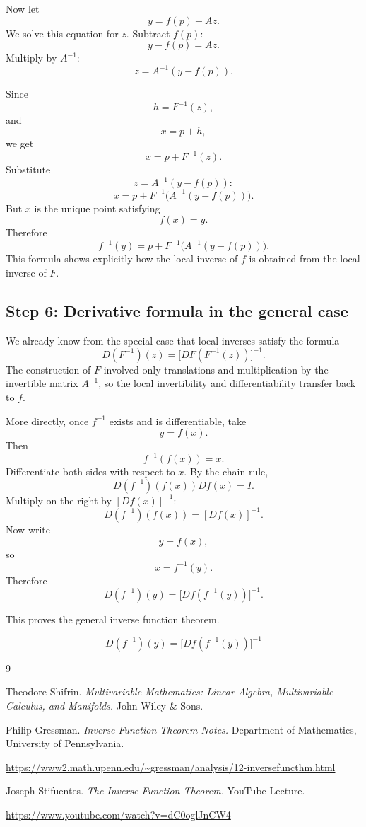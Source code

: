 \documentclass[11pt]{article}
\begin{document}
Now let
\[
y=f(p)+Az.
\]
We solve this equation for $z$. Subtract $f(p)$:
\[
y-f(p)=Az.
\]
Multiply by $A^{-1}$:
\[
z=A^{-1}(y-f(p)).
\]

Since
\[
h=F^{-1}(z),
\]
and
\[
x=p+h,
\]
we get
\[
x=p+F^{-1}(z).
\]
Substitute
\[
z=A^{-1}(y-f(p)):
\]
\[
x=p+F^{-1}\bigl(A^{-1}(y-f(p))\bigr).
\]
But $x$ is the unique point satisfying
\[
f(x)=y.
\]
Therefore
\[
f^{-1}(y)=p+F^{-1}\bigl(A^{-1}(y-f(p))\bigr).
\]
This formula shows explicitly how the local inverse of $f$ is obtained from the local inverse of $F$.

\subsection*{Step 6: Derivative formula in the general case}

We already know from the special case that local inverses satisfy the formula
\[
D(F^{-1})(z)=\bigl[DF(F^{-1}(z))\bigr]^{-1}.
\]
The construction of $F$ involved only translations and multiplication by the invertible matrix $A^{-1}$, so the local invertibility and differentiability transfer back to $f$.

More directly, once $f^{-1}$ exists and is differentiable, take
\[
y=f(x).
\]
Then
\[
f^{-1}(f(x))=x.
\]
Differentiate both sides with respect to $x$. By the chain rule,
\[
D(f^{-1})(f(x))Df(x)=I.
\]
Multiply on the right by $[Df(x)]^{-1}$:
\[
D(f^{-1})(f(x))= [Df(x)]^{-1}.
\]
Now write
\[
y=f(x),
\]
so
\[
x=f^{-1}(y).
\]
Therefore
\[
D(f^{-1})(y)=\bigl[Df(f^{-1}(y))\bigr]^{-1}.
\]

This proves the general inverse function theorem.

\[
\boxed{D(f^{-1})(y)=\bigl[Df(f^{-1}(y))\bigr]^{-1}}
\]

%

\begin{thebibliography}{9}

Theodore Shifrin.
\textit{Multivariable Mathematics:
Linear Algebra, Multivariable Calculus, and Manifolds.}
John Wiley \& Sons.

\vspace{6pt}

Philip Gressman.
\textit{Inverse Function Theorem Notes.}
Department of Mathematics,
University of Pennsylvania.

\smallskip
\url{https://www2.math.upenn.edu/~gressman/analysis/12-inversefuncthm.html}

\vspace{6pt}

Joseph Stifuentes.
\textit{The Inverse Function Theorem.}
YouTube Lecture.

\smallskip
\url{https://www.youtube.com/watch?v=dC0oglJnCW4}

\end{thebibliography}
%
\end{document}
